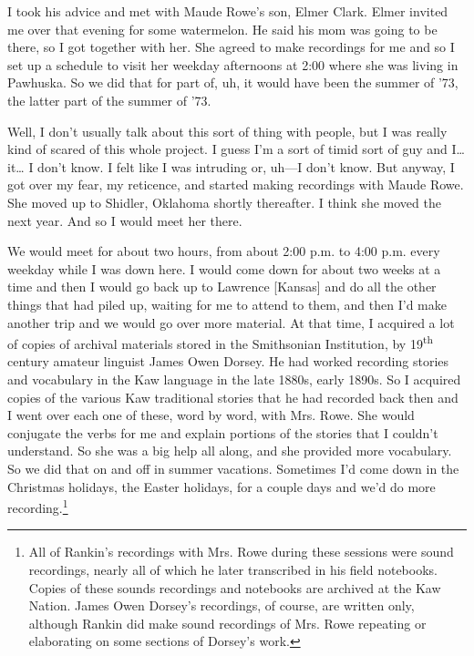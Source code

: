 \documentclass[output=paper]{LSP/langsci}
\begin{document}
I took his advice and met with Maude Rowe's son, Elmer Clark. Elmer invited me over that evening for some watermelon. He said his mom was going to be there, so I got together with her. She agreed to make recordings for me and so I set up a schedule to visit her weekday afternoons at 2:00 where she was living in Pawhuska. So we did that for part of, uh, it would have been the summer of '73, the latter part of the summer of '73. 

Well, I don't usually talk about this sort of thing with people, but I was really kind of scared of this whole project. I guess I'm a sort of timid sort of guy and I{\ldots} it{\ldots} I don't know. I felt like I was intruding or, uh---I don't know. But anyway, I got over my fear, my reticence, and started making recordings with Maude Rowe. She moved up to Shidler, Oklahoma shortly thereafter. I think she moved the next year. And so I would meet her there. 

We would meet for about two hours, from about 2:00 p.m. to 4:00 p.m. every weekday while I was down here. I would come down for about two weeks at a time and then I would go back up to Lawrence [Kansas] and do all the other things that had piled up, waiting for me to attend to them, and then I'd make another trip and we would go over more material. At that time, I acquired a lot of copies of archival materials stored in the Smithsonian Institution, by 19\textsuperscript{th} century amateur linguist James Owen Dorsey. He had worked recording stories and vocabulary in the Kaw language in the late 1880s, early 1890s. So I acquired copies of the various Kaw traditional stories that he had recorded back then and I went over each one of these, word by word, with Mrs. Rowe. She would conjugate the verbs for me and explain portions of the stories that I couldn't understand. So she was a big help all along, and she provided more vocabulary. So we did that on and off in summer vacations. Sometimes I'd come down in the Christmas holidays, the Easter holidays, for a couple days and we'd do more recording.\footnote{All of Rankin's recordings with Mrs. Rowe during these sessions were sound recordings, nearly all of which he later transcribed in his field notebooks. Copies of these sounds recordings and notebooks are archived at the Kaw Nation. James Owen Dorsey's recordings, of course, are written only, although Rankin did make sound recordings of Mrs. Rowe repeating or elaborating on some sections of Dorsey's work.}
\end{document}
